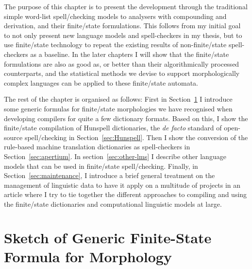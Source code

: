 \documentclass[officiallayout]{unihelcompling}
\begin{document}
The purpose of this chapter is to present the development through the
traditional simple word-list spell\-/checking models to 
analysers with compounding and derivation, and their finite\-/state formulations.
This follows from my initial goal to not only present new language models and
spell-checkers in my thesis, but to use finite\-/state technology to repeat the
existing results of non-finite\-/state spell-checkers as a baseline. In the later
chapters I will show that the finite\-/state formulations are also as good as, or
better than their algorithmically processed counterparts, and the statistical
methods we devise to support morphologically complex languages can be applied
to these finite\-/state automata.

The rest of the chapter is organised as follows: First in
Section~\ref{sec:generic} I introduce some generic formulas for finite\-/state
morphologies we have recognised when developing compilers for quite a few
dictionary formats. Based on this, I show the finite\-/state compilation of
Hunspell dictionaries, the \emph{de facto} standard of open-source spell\-/checking in
Section~\ref{sec:Hunspell}.  Then I show the conversion of the rule-based
machine translation dictionaries as spell-checkers in
Section~\ref{sec:apertium}. In section~\ref{sec:other-lms} I describe other
language models that can be used in finite\-/state spell\-/checking. Finally, in
Section~\ref{sec:maintenance}, I introduce a brief general treatment on the
management of linguistic data to have it apply on a multitude of projects in an
article where I try to tie together the different approaches to compiling and
using the finite\-/state dictionaries and computational linguistic models at
large.

\section{Sketch of Generic Finite-State Formula for Morphology}
\label{sec:generic}
\end{document}
